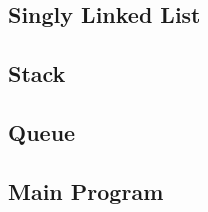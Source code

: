 \documentclass[letterpaper, 10pt,DIV=13]{scrartcl}
\numberwithin{equation}{section} %
\numberwithin{figure}{section} %
\numberwithin{table}{section} %
\begin{document}
\subsection{Singly Linked List}\label{nodeListing}



\subsection{Stack}\label{stackListing}



\subsection{Queue}\label{queueListing}



\subsection{Main Program}\label{mainProgramListing}

\end{document}
